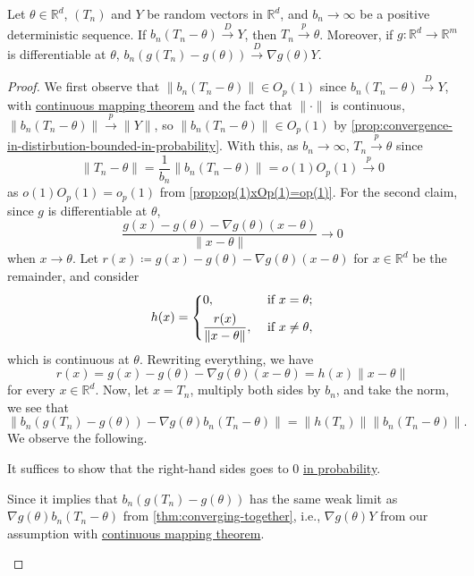 \begin{theorem}\label{thm:delta-method}
	Let \(\theta \in \mathbb{R} ^d\), \((T_n)\) and \(Y\) be random vectors in \(\mathbb{R} ^d\), and \(b_n \to \infty \) be a positive deterministic sequence. If \(b_n (T_n - \theta ) \overset{D}{\to } Y\), then \(T_n \overset{p}{\to } \theta \). Moreover, if \(g \colon \mathbb{R} ^d \to \mathbb{R} ^m\) is differentiable at \(\theta \), \(b_n (g(T_n) - g(\theta )) \overset{D}{\to } \nabla g(\theta ) Y\).
\end{theorem}
\begin{proof}
	We first observe that \(\lVert b_n (T_n - \theta ) \rVert \in O_p(1)\) since \(b_n(T_n - \theta ) \overset{D}{\to } Y\), with \hyperref[thm:continuous-mapping]{continuous mapping theorem} and the fact that \(\lVert \cdot \rVert \) is continuous, \(\lVert b_n (T_n - \theta ) \rVert \overset{p}{\to } \lVert Y \rVert \), so \(\lVert b_n (T_n - \theta ) \rVert \in O_p(1)\) by \autoref{prop:convergence-in-distirbution-bounded-in-probability}. With this, as \(b_n \to \infty \), \(T_n \overset{p}{\to } \theta \) since
	\[
		\lVert T_n - \theta \rVert
		= \frac{1}{b_n} \lVert b_n (T_n - \theta ) \rVert
		= o(1) O_p(1)
		\overset{p}{\to } 0
	\]
	as \(o(1) O_p(1) = o_p(1)\) from \autoref{prop:op(1)xOp(1)=op(1)}. For the second claim, since \(g\) is differentiable at \(\theta \),
	\[
		\frac{g(x) - g(\theta ) - \nabla g(\theta ) (x - \theta )}{\lVert x - \theta \rVert } \to 0
	\]
	when \(x \to \theta \). Let \(r(x) \coloneqq g(x) - g(\theta ) - \nabla g(\theta ) (x - \theta )\) for \(x \in \mathbb{R} ^d\) be the remainder, and consider
	\[
		h(x) = \begin{dcases}
			0,                                       & \text{ if } x = \theta  ;   \\
			\frac{r(x)}{\lVert x - \theta  \rVert }, & \text{ if } x \neq \theta ,
		\end{dcases}
	\]
	which is continuous at \(\theta \). Rewriting everything, we have
	\[
		r(x)
		= g(x) - g(\theta ) - \nabla g(\theta ) (x - \theta )
		= h(x) \lVert x - \theta \rVert
	\]
	for every \(x \in \mathbb{R} ^d\). Now, let \(x = T_n\), multiply both sides by \(b_n\), and take the norm, we see that
	\[
		\left\lVert b_n \left( g(T_n) - g(\theta ) \right)  - \nabla g(\theta ) b_n (T_n - \theta ) \right\rVert
		= \lVert h(T_n) \rVert \lVert  b_n (T_n - \theta ) \rVert.
	\]
	We observe the following.

	\begin{claim}
		It suffices to show that the right-hand sides goes to \(0\) \hyperref[def:converge-in-probability]{in probability}.
	\end{claim}
	\begin{explanation}
		Since it implies that \(b_n(g(T_n) - g(\theta ))\) has the same weak limit as \(\nabla g(\theta ) b_n (T_n - \theta )\) from \autoref{thm:converging-together}, i.e., \(\nabla g(\theta ) Y\) from our assumption with \hyperref[thm:continuous-mapping]{continuous mapping theorem}.
	\end{explanation}


\end{proof}
